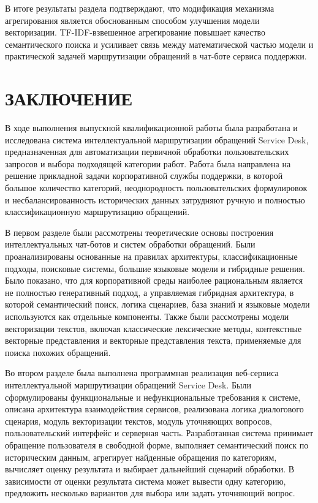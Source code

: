 \documentclass[14pt,a4paper]{extarticle}
\numberwithin{figure}{section}
\numberwithin{table}{section}
\begin{document}
В итоге результаты раздела подтверждают, что модификация механизма агрегирования
является обоснованным способом улучшения модели векторизации.
TF-IDF-взвешенное агрегирование повышает качество семантического поиска и
усиливает связь между математической частью модели и практической
задачей маршрутизации обращений в чат-боте сервиса поддержки.

\clearpage
\section*{ЗАКЛЮЧЕНИЕ}

В ходе выполнения выпускной квалификационной работы была разработана и
исследована система интеллектуальной маршрутизации обращений Service
Desk, предназначенная для автоматизации первичной обработки
пользовательских запросов и выбора подходящей категории работ. Работа
была направлена на решение прикладной задачи корпоративной службы
поддержки, в которой большое количество категорий, неоднородность
пользовательских формулировок и несбалансированность исторических данных
затрудняют ручную и полностью классификационную маршрутизацию обращений.

В первом разделе были рассмотрены теоретические основы построения
интеллектуальных чат-ботов и систем обработки обращений. Были
проанализированы основанные на правилах архитектуры, классификационные подходы,
поисковые системы, большие языковые модели и гибридные решения.
Было показано, что для корпоративной среды наиболее рациональным
является не полностью генеративный подход, а управляемая гибридная
архитектура, в которой семантический поиск, логика сценариев, база
знаний и языковые модели используются как отдельные компоненты. Также
были рассмотрены модели векторизации текстов, включая классические
лексические методы, контекстные векторные представления и векторные представления текста,
применяемые для поиска похожих обращений.

Во втором разделе была выполнена программная реализация веб-сервиса
интеллектуальной маршрутизации обращений Service Desk. Были
сформулированы функциональные и нефункциональные требования к системе,
описана архитектура взаимодействия сервисов, реализована логика
диалогового сценария, модуль векторизации текстов, модуль уточняющих
вопросов, пользовательский интерфейс и серверная часть. Разработанная
система принимает обращение пользователя в свободной форме, выполняет
семантический поиск по историческим данным, агрегирует найденные
обращения по категориям, вычисляет оценку результата и выбирает
дальнейший сценарий обработки. В зависимости от оценки результата система
может вывести одну категорию, предложить несколько вариантов для выбора
или задать уточняющий вопрос.
\end{document}

